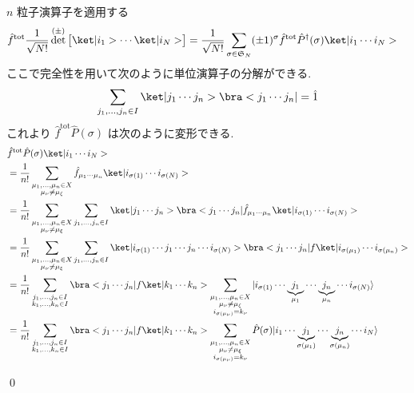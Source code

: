 \documentclass[uplatex,dvipdfmx,a4paper,11pt]{jlreq}
\makeatletter
\DeclareMathOperator{\Det}{det}
\renewcommand{\SS}{\mathfrak{S}}
\numberwithin{equation}{section}
\theoremstyle{definition}
\renewenvironment{proof}[1][\proofname]{\par
  \normalfont
  \topsep6\p@\@plus6\p@ \trivlist
  \item[\hskip\labelsep{\bfseries #1}\@addpunct{\bfseries}]\ignorespaces\quad\par
}{
  \qed\endtrivlist\@endpefalse
}
\renewcommand\proofname{証明}
\makeatother
\begin{document}
\begin{proof}
  $n$ 粒子演算子を適用する
  \begin{align}
    \hat{f}^{\mathrm{tot}}\frac{1}{\sqrt{N!}}\Det^{(\pm)}\begin{bmatrix}\ket|i_1>\cdots\ket|i_N>\end{bmatrix}
     & = \frac{1}{\sqrt{N!}}\sum_{\sigma\in\SS_N}(\pm1)^\sigma\hat{f}^{\mathrm{tot}}\hat{P}^\dagger(\sigma)\ket|i_1\cdots i_N>
  \end{align}
  ここで完全性を用いて次のように単位演算子の分解ができる.
  \begin{align}
    \sum_{j_1,\ldots,j_n\in I}\ket|j_1\cdots j_n>\bra<j_1\cdots j_n| = \hat{1}
  \end{align}
  これより $\hat{f}^{\mathrm{tot}}\hat{P}(\sigma)$ は次のように変形できる.
  \begin{align}
     & \hat{f}^{\mathrm{tot}}\hat{P}(\sigma)\ket|i_1\cdots i_N> \\
     & = \frac{1}{n!}\sum_{\substack{\mu_1,\ldots,\mu_n\in X    \\ \mu_\nu\neq\mu_\xi}}\hat{f}_{\mu_1\cdots\mu_n}\ket|i_{\sigma(1)}\cdots i_{\sigma(N)}> \\
     & = \frac{1}{n!}\sum_{\substack{\mu_1,\ldots,\mu_n\in X    \\ \mu_\nu\neq\mu_\xi}}\sum_{j_1,\ldots,j_n\in I}\ket|j_1\cdots j_n>\bra<j_1\cdots j_n|\hat{f}_{\mu_1\cdots\mu_n}\ket|i_{\sigma(1)}\cdots i_{\sigma(N)}>                                                           \\
     & = \frac{1}{n!}\sum_{\substack{\mu_1,\ldots,\mu_n\in X    \\ \mu_\nu\neq\mu_\xi}}\sum_{j_1,\ldots,j_n\in I}\ket|i_{\sigma(1)}\cdots j_1\cdots j_n\cdots i_{\sigma(N)}>\bra<j_1\cdots j_n|f\ket|i_{\sigma(\mu_1)}\cdots i_{\sigma(\mu_n)}>                                                           \\
     & = \frac{1}{n!}\sum_{\substack{j_1,\ldots,j_n\in I        \\ k_1,\ldots,k_n\in I}}\bra<j_1\cdots j_n|f\ket|k_1\cdots k_n>\sum_{\substack{\mu_1,\ldots,\mu_n\in X \\ \mu_\nu\neq\mu_\xi \\ i_{\sigma(\mu_\nu)} = k_\nu}}|i_{\sigma(1)}\cdots\underbrace{j_1}_{\mu_1}\cdots\underbrace{j_n}_{\mu_n}\cdots i_{\sigma(N)}\rangle \\
     & = \frac{1}{n!}\sum_{\substack{j_1,\ldots,j_n\in I        \\ k_1,\ldots,k_n\in I}}\bra<j_1\cdots j_n|f\ket|k_1\cdots k_n>\sum_{\substack{\mu_1,\ldots,\mu_n\in X \\ \mu_\nu\neq\mu_\xi \\ i_{\sigma(\mu_\nu)} = k_\nu}}\hat{P}(\sigma)|i_1\cdots\underbrace{j_1}_{\sigma(\mu_1)}\cdots\underbrace{j_n}_{\sigma(\mu_n)}\cdots i_N\rangle

\end{align}
\end{proof}
\end{document}
